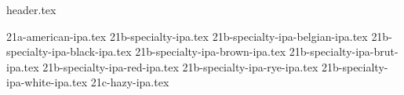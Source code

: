 \clearpage
{}
\divisorLine
{header.tex}
\begin{multicols*}{2}
{21a-american-ipa.tex}
{21b-specialty-ipa.tex}
{21b-specialty-ipa-belgian-ipa.tex}
{21b-specialty-ipa-black-ipa.tex}
{21b-specialty-ipa-brown-ipa.tex}
{21b-specialty-ipa-brut-ipa.tex}
{21b-specialty-ipa-red-ipa.tex}
{21b-specialty-ipa-rye-ipa.tex}
{21b-specialty-ipa-white-ipa.tex}
{21c-hazy-ipa.tex}
\end{multicols*}